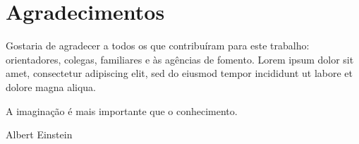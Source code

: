 \documentclass[dsc,pdfa,setavermelha]{ufrj}
\theoremstyle{plain}
\theoremstyle{definition}
\theoremstyle{remark}
\begin{document}

  \maketitle

  \frontmatter
  \dedication{A alguém cujo valor é digno desta dedicatória.}

  \chapter*{Agradecimentos}

  Gostaria de agradecer a todos os que contribuíram para este trabalho:
  orientadores, colegas, familiares e às agências de fomento. Lorem ipsum
  dolor sit amet, consectetur adipiscing elit, sed do eiusmod tempor incididunt
  ut labore et dolore magna aliqua.

  \epigraph{A imaginação é mais importante que o conhecimento.}{Albert Einstein}

  \begin{abstract}%

  Apresenta-se, nesta tese, um exemplo de resumo. Lorem ipsum dolor sit amet,
  consectetur adipiscing elit, sed do eiusmod tempor incididunt ut labore et
  dolore magna aliqua. Ut enim ad minim veniam, quis nostrud exercitation
  ullamco laboris nisi ut aliquip ex ea commodo consequat. Duis aute irure dolor
  in reprehenderit in voluptate velit esse cillum dolore eu fugiat nulla
  pariatur. Excepteur sint occaecat cupidatat non proident, sunt in culpa qui
  officia deserunt mollit anim id est laborum. Sed ut perspiciatis unde omnis
  iste natus error sit voluptatem accusantium doloremque laudantium, totam rem
  aperiam, eaque ipsa quae ab illo inventore veritatis et quasi architecto beatae
  vitae dicta sunt explicabo, nemo enim ipsam voluptatem quia voluptas sit
  aspernatur aut odit aut fugit.

  \end{abstract}
\end{document}

